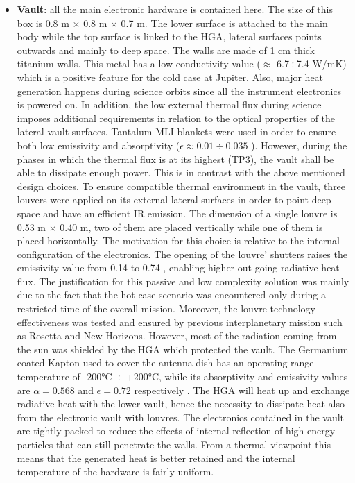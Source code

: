 \begin{itemize}
    \item \textbf{Vault}:  all the main electronic hardware is contained here. The size of this box is 0.8 m $\times$ 0.8 m $\times$ 0.7 m. The lower surface is attached to the main body while the top surface is linked to the HGA, lateral surfaces points outwards and mainly to deep space. The walls are made of 1 cm thick titanium walls. This metal has a low conductivity value ($\approx$ 6.7$\div$7.4 W/mK) which is a positive feature for the cold case at Jupiter. Also, major heat generation happens during science orbits since all the instrument electronics is powered on. In addition, the low external thermal flux during science imposes additional requirements in relation to the optical properties of the lateral vault surfaces. 
    Tantalum MLI blankets were used in order to ensure both low emissivity and absorptivity ($\epsilon \approx 0.01 \div 0.035$ \cite{mli_blankets}). 
    However, during the phases in which the thermal flux is at its highest (TP3), the vault shall be able to dissipate enough power. This is in contrast with the above mentioned design choices. To ensure compatible thermal environment in the vault, three louvers were applied on its external lateral surfaces in order to point deep space and have an efficient IR emission. The dimension of a single louvre is 0.53 m $\times$ 0.40 m, two of them are placed vertically while one of them is placed horizontally. The motivation for this choice is relative to the internal configuration of the electronics. The opening of the louvre' shutters raises the emissivity value from 0.14 to 0.74 , enabling higher out-going radiative heat flux.\cite{louvers}
    The justification for this passive and low complexity solution  was mainly due to the fact that the hot case scenario was encountered only during a restricted time of the overall mission. Moreover, the louvre technology effectiveness was tested and ensured by previous interplanetary mission such as Rosetta and New Horizons. 
    However, most of the radiation coming from the sun was shielded by the HGA which protected the vault. 
    The Germanium coated Kapton used to cover the antenna dish has an operating range temperature of -200°C $\div$ +200°C, while its absorptivity and emissivity values are $\alpha = 0.568$ and  $\epsilon = 0.72$ respectively \cite{ge_kapton}.
    The HGA will heat up and exchange radiative heat with the lower vault, hence the necessity to dissipate heat also from the electronic vault with louvres.
    The electronics contained in the vault are tightly packed to reduce the effects of internal reflection of high energy particles that can still penetrate the walls. From a thermal viewpoint this means that the generated heat is better retained and the internal temperature of the hardware is fairly uniform.
    

\end{itemize}
